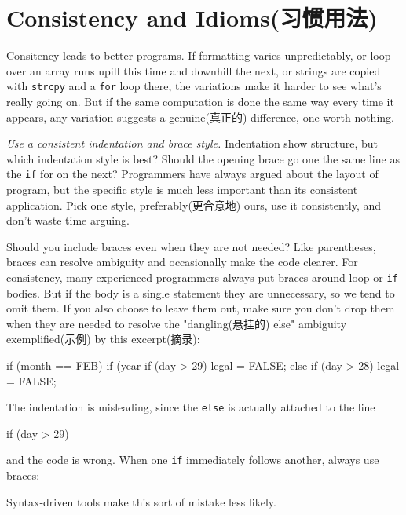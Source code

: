 \section{Consistency and Idioms(习惯用法)}
\label{sec:consist_idom}
Consitency leads to better programs. If formatting varies unpredictably, or
loop over an array runs upill this time and downhill the next, or strings
are copied with \verb'strcpy' and a \verb'for' loop there, the variations
make it harder to see what's really going on. But if the same computation
is done the same way every time it appears, any variation suggests a
genuine(真正的) difference, one worth nothing.

\emph{Use a consistent indentation and brace style.} Indentation show
structure, but which indentation style is best? Should the opening brace go
one the same line as the \verb'if' for on the next? Programmers have always
argued about the layout of program, but the specific style is much less
important than its consistent application. Pick one style,
preferably(更合意地) ours, use it consistently, and don't waste time
arguing.

Should you include braces even when they are not needed? Like parentheses,
braces can resolve ambiguity and occasionally make the code clearer. For
consistency, many experienced programmers always put braces around loop
or \verb'if' bodies. But if the body is a single statement they are
unnecessary, so we tend to omit them. If you also choose to leave them out,
make sure you don't drop them when they are needed to resolve the
"dangling(悬挂的) else" ambiguity exemplified(示例) by this excerpt(摘录):
\begin{badcode}
    if (month == FEB) {
        if (year%
            if (day > 29)
                legal = FALSE;
        else 
            if (day > 28)
                legal = FALSE;
    }
\end{badcode}
The indentation is misleading, since the \verb'else' is actually attached
to the line 
\begin{badcode}
    if (day > 29)
\end{badcode}
and the code is wrong. When one \verb'if' immediately follows another,
always use braces:
Syntax-driven tools make this sort of mistake less likely.


